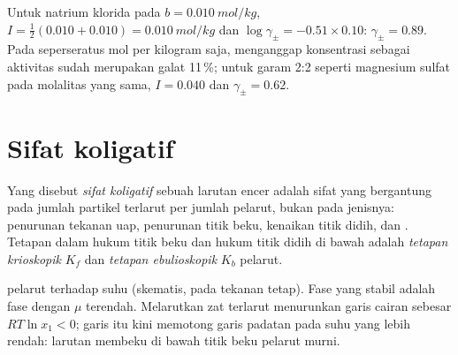 \begin{example}\label{ex:b2:chemical-potential:dh}
Untuk natrium klorida pada $b = \qty{0.010}{mol/kg}$, $I = \frac12(0.010 + 0.010)
= \qty{0.010}{mol/kg}$ dan $\log\gamma_\pm = -0.51 \times 0.10$:
$\gamma_\pm
= 0.89$. Pada seperseratus mol per kilogram saja, menganggap
konsentrasi sebagai aktivitas sudah merupakan galat 11\,\%; untuk garam 2:2
seperti magnesium sulfat pada molalitas yang sama, $I = 0.040$ dan
$\gamma_\pm = 0.62$.
\end{example}

\section{Sifat koligatif}

\begin{definition}\label{def:b2:chemical-potential:colligative}
Yang disebut \emph{sifat koligatif} sebuah larutan
encer adalah sifat yang bergantung pada jumlah partikel terlarut per
jumlah pelarut, bukan pada jenisnya: penurunan tekanan uap, penurunan
titik beku, kenaikan titik didih, dan . Tetapan dalam
hukum titik beku dan hukum titik didih di bawah adalah \emph{tetapan
krioskopik} $K_f$ dan \emph{tetapan
ebulioskopik} $K_b$ pelarut.
\end{definition}

\begin{omfigure}

{\small {} pelarut terhadap suhu (skematis, pada tekanan
tetap). Fase yang stabil adalah fase dengan $\mu$ terendah. Melarutkan zat
terlarut menurunkan garis cairan sebesar $RT\ln x_1 < 0$; garis itu kini
memotong garis padatan pada suhu yang lebih rendah: larutan membeku di
bawah titik beku pelarut murni.}
\end{omfigure}

